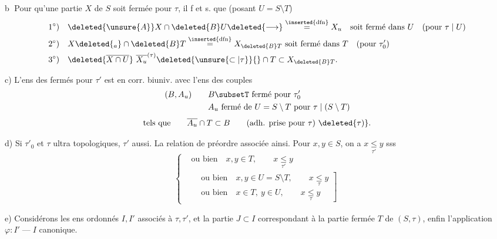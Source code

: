 \textcircled{b} Pour qu'une partie $X$ de $S$ soit fermée pour $\tau$, il f et s. que (posant $U=S\setminus T$)
\[
\begin{aligned}
1^\circ)\quad &\deleted{\unsure{A}}X\cap \deleted{B}U\deleted{\longrightarrow}\overset{\inserted{\mathrm{dfn}}}{=}X_{u}\quad\text{soit fermé dans }U\quad(\text{pour }\tau\mid U)\\
2^\circ)\quad &X\deleted{_a}\cap\deleted{B}T\overset{\inserted{\mathrm{dfn}}}{=}X_{\deleted{B}T}\ \text{soit fermé dans }T\quad(\text{pour }\tau'_0)\\
3^\circ)\quad &\deleted{\overline{X\cap U}}\ \overline{X_u}^{(\tau)}\deleted{\unsure{\subset|\tau}}{}\cap T\subset X_{\deleted{B}T}.
\end{aligned}
\]

c) L'ens des fermés pour $\tau'$ est en corr. biuniv. avec l'ens des couples
\[
\begin{aligned}
(B,A_{u}) \qquad & B\subsetT\ \text{fermé pour }\tau'_0\\
& A_u\ \text{fermé de }U=S\setminus T\ \text{pour }\tau\mid(S\setminus T)
\end{aligned}
\]
\[
\text{tels que}\qquad \overline{A_u}\cap T\subset B \qquad
\text{(adh. prise pour }\tau\text{)}\ \deleted{\tau)}.
\]

d) Si $\tau'_0$ et $\tau$ ultra topologiques, $\tau'$ aussi. La relation de préordre associée   ainsi. Pour $x,y\in S$, on a $x\underset{\tau'}{\leq}y$ sss
\[
\left\{\begin{aligned}
&\text{ou bien}\quad x,y\in T,\qquad x\underset{\tau'}{\leq}y\\
&\left.\begin{aligned}
&\text{ou bien}\quad x,y\in U=S\setminus T,\qquad x\underset{\tau}{\leq}y\\
&\text{ou bien}\quad x\in T,\ y\in U,\qquad x\underset{\tau}{\leq}y
\end{aligned}\right]
\end{aligned}\right.
\]

e)  Considérons les ens ordonnés $I,I'$ associés à $\tau,\tau'$, et la partie  $J\subset I$ correspondant à la partie fermée $T$ de $(S,\tau)$, enfin l'application $\varphi:I'\mathbin{\text{---}}I$ canonique.

